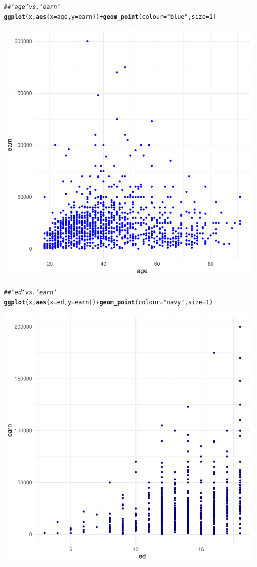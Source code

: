 \documentclass{article}\usepackage[]{graphicx}\usepackage[]{xcolor}
\makeatletter
\newcommand{\hlnum}[1]{\textcolor[rgb]{0.686,0.059,0.569}{#1}}%
\newcommand{\hlstr}[1]{\textcolor[rgb]{0.192,0.494,0.8}{#1}}%
\newcommand{\hlcom}[1]{\textcolor[rgb]{0.678,0.584,0.686}{\textit{#1}}}%
\newcommand{\hlopt}[1]{\textcolor[rgb]{0,0,0}{#1}}%
\newcommand{\hlstd}[1]{\textcolor[rgb]{0.345,0.345,0.345}{#1}}%
\newcommand{\hlkwc}[1]{\textcolor[rgb]{0.333,0.667,0.333}{#1}}%
\newcommand{\hlkwd}[1]{\textcolor[rgb]{0.737,0.353,0.396}{\textbf{#1}}}%
\newenvironment{kframe}{%
 \def\at@end@of@kframe{}%
 \ifinner\ifhmode%
  \def\at@end@of@kframe{\end{minipage}}%
  \begin{minipage}{\columnwidth}%
 \fi\fi%
 \def\FrameCommand##1{\hskip\@totalleftmargin \hskip-\fboxsep
 \colorbox{shadecolor}{##1}\hskip-\fboxsep
     \hskip-\linewidth \hskip-\@totalleftmargin \hskip\columnwidth}%
 \MakeFramed {\advance\hsize-\width
   \@totalleftmargin\z@ \linewidth\hsize
   \@setminipage}}%
 {\par\unskip\endMakeFramed%
 \at@end@of@kframe}
\newenvironment{knitrout}{}{} %
\makeatother
\begin{document}
\begin{knitrout}
{}


\begin{kframe}\begin{alltt}
\hlcom{## `age` vs. `earn`}
\hlkwd{ggplot}\hlstd{(x,} \hlkwd{aes}\hlstd{(}\hlkwc{x}\hlstd{=age,} \hlkwc{y}\hlstd{=earn))} \hlopt{+} \hlkwd{geom_point}\hlstd{(}\hlkwc{colour} \hlstd{=} \hlstr{"blue"}\hlstd{,} \hlkwc{size} \hlstd{=} \hlnum{1}\hlstd{)}
\end{alltt}
\end{kframe}

{\centering \includegraphics[width=.6\linewidth]{figure/assignment-03-SyversonLuke-Rnwauto-report-2} 

}


\begin{kframe}\begin{alltt}
\hlcom{## `ed` vs. `earn`}
\hlkwd{ggplot}\hlstd{(x,} \hlkwd{aes}\hlstd{(}\hlkwc{x}\hlstd{=ed,} \hlkwc{y}\hlstd{=earn))} \hlopt{+} \hlkwd{geom_point}\hlstd{(}\hlkwc{colour} \hlstd{=} \hlstr{"navy"}\hlstd{,} \hlkwc{size} \hlstd{=} \hlnum{1}\hlstd{)}
\end{alltt}
\end{kframe}

{\centering \includegraphics[width=.6\linewidth]{figure/assignment-03-SyversonLuke-Rnwauto-report-3} 

}
\end{knitrout}
\end{document}
